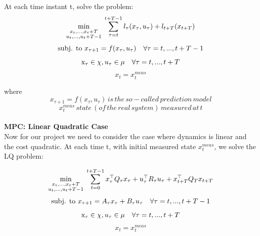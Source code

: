 \documentclass[a4paper,11pt,oneside]{book}
\begin{document}
At each time instant t, solve the problem:
\begin{equation*}
\min_{\substack{{x_t,...,x_t+T}\\{u_t,...,u_t+T-1}}} \;  \sum\limits_{\tau=t}^{t+T-1}l_\tau (x_\tau,u_\tau) + l_{t+T} (x_{t+T})\\
\end{equation*}
\begin{equation*}
\textrm{subj. to }x_{\tau+1}=f{(x_\tau,u_\tau)} \quad \forall \tau = t, ..., t+T-1 \\
\end{equation*}
\begin{equation*}
\textrm x_{\tau}\in \chi, u_{\tau}\in \mu \quad \forall \tau = t, ..., t+T \\
\end{equation*}
\begin{equation*}
x_t = x_t^{meas}
\end{equation*}

where
\begin{equation*}
 x_{\tau+1}=f{(x_\tau,u_\tau)}\, is \, the \, so-called \, prediction \, model
\end{equation*}
\begin{equation*}
 x_t^{meas}\, state \, (of \, the \, real \, system) \, measured \, at \, t
\end{equation*}
\\
\textbf{MPC: Linear Quadratic Case}\\

Now for our project we need to consider the case where dynamics is linear and the cost quadratic. At each time t, with initial measured state $x_t^{meas}$, we solve the LQ problem:

\begin{equation*}
\min_{\substack{{x_t,...,x_t+T}\\{u_t,...,u_t+T-1}}} \;  \sum\limits_{t=0}^{t+T-1} x_\tau^\top Q_{\tau}x_\tau + u_\tau^\top R_{\tau}u_\tau + x_{t+T}^\top Q_{T} x_{t+T}\\
\end{equation*}
\begin{equation*}
\textrm{subj. to }x_{\tau+1}=A_\tau x_\tau+B_\tau u_\tau \quad \forall \tau = t, ..., t+T-1 \\
\end{equation*}
\begin{equation*}
\textrm x_{\tau}\in \chi, u_{\tau}\in \mu \quad \forall \tau = t, ..., t+T \\
\end{equation*}
\begin{equation*}
x_t = x_t^{meas}
\end{equation*}
\end{document}
